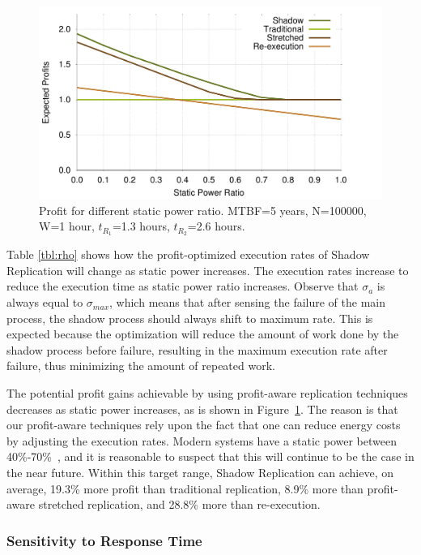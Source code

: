 \begin{figure}[!h]	
	\begin{center}
		\includegraphics[width=\columnwidth]{Figures/rho_profit}
	\end{center}
	\caption{Profit for different static power ratio. MTBF=5 years, N=100000, W=1 hour, $t_{R_1}$=1.3 hours, $t_{R_2}$=2.6 hours.}
	\label{fig:rho}
\end{figure}

Table \ref{tbl:rho} shows how the profit-optimized execution rates
of Shadow Replication will change as static power increases. The execution rates increase to reduce the execution time as static power ratio increases. Observe
that $\sigma_a$ is always equal to $\sigma_{max}$, which means that after
sensing the failure of the main process, the shadow process should always
shift to maximum rate. This is expected because the optimization will
reduce the amount of work done by the shadow process before failure,
resulting in the maximum execution rate after failure, thus
minimizing the amount of repeated work. 

The potential profit gains achievable by using profit-aware
replication techniques decreases as static power increases, as is shown
in Figure~\ref{fig:rho}. The reason is that our profit-aware
techniques rely upon the fact that one can reduce energy costs by
adjusting the execution rates. Modern systems have a static power between 40\%-70\%~\cite{butts2000static}, and
it is reasonable to suspect that this will continue to be the case in the near future. Within
this target range, Shadow Replication can achieve, on
average, 19.3\% more profit than traditional replication, 8.9\% more
than profit-aware stretched replication, and 28.8\% more than re-execution.


\subsubsection{Sensitivity to Response Time}

